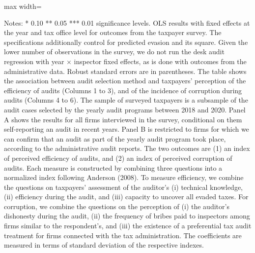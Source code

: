 \documentclass{article}
\newcommand{\OutPath}{Output/}%
\newcommand{\OutPath}{../Output/}%
\begin{document}
\begin{table}[H]\centering
\begin{adjustbox}{max width=\textwidth}
\begin{threeparttable}
\caption{Algorithm Selection, Perceived Audit Efficiency and Corruption, with Predicted Evasion Quadratic Control}
\label{tab:table6_indices_yhatrf_quadratic_control}

\footnotesize


\begin{tablenotes}[flushleft]
\footnotesize
\item Notes: * 0.10 ** 0.05 *** 0.01 significance levels. OLS results with fixed effects at the year and tax office level for outcomes from the taxpayer survey. The specifications additionally control for predicted evasion and its square. Given the lower number of observations in the survey, we do not run the desk audit regression with year $\times$ inspector fixed effects, as is done with outcomes from the administrative data. Robust standard errors are in parentheses. The table shows the association between audit selection method and taxpayers' perception of the efficiency of audits (Columns 1 to 3), and of the incidence of corruption during audits (Columns 4 to 6). The sample of surveyed taxpayers is a subsample of the audit cases selected by the yearly audit programs between 2018 and 2020. Panel A shows the results for all firms interviewed in the survey, conditional on them self-reporting an audit in recent years. Panel B is restricted to firms for which we can confirm that an audit as part of the yearly audit program took place, according to the administrative audit reports. The two outcomes are (1) an index of perceived efficiency of audits, and (2) an index of perceived corruption of audits. Each measure is constructed by combining three questions into a normalized index following Anderson (2008). To measure efficiency, we combine the questions on taxpayers' assessment of the auditor's (i) technical knowledge, (ii) efficiency during the audit, and (iii) capacity to uncover all evaded taxes. For corruption, we combine the questions on the perception of (i) the auditor's dishonesty during the audit, (ii) the frequency of bribes paid to inspectors among firms similar to the respondent's, and (iii) the existence of a preferential tax audit treatment for firms connected with the tax administration. The coefficients are measured in terms of standard deviation of the respective indexes.
\end{tablenotes}
\end{threeparttable}
\end{adjustbox}
\end{table}
\end{document}
